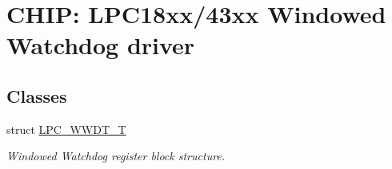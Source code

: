 \hypertarget{group___w_w_d_t__18_x_x__43_x_x}{}\section{C\+H\+IP\+: L\+P\+C18xx/43xx Windowed Watchdog driver}
\label{group___w_w_d_t__18_x_x__43_x_x}
\subsection*{Classes}
\begin{DoxyCompactItemize}
\item 
struct \hyperlink{struct_l_p_c___w_w_d_t___t}{L\+P\+C\+\_\+\+W\+W\+D\+T\+\_\+T}
\begin{DoxyCompactList}\small\item\em Windowed Watchdog register block structure. \end{DoxyCompactList}\end{DoxyCompactItemize}
